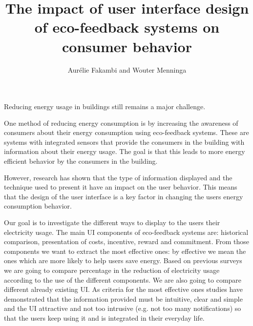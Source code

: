 \documentclass[journal]{vgtc}                %
\title{The impact of user interface design of eco-feedback systems on consumer behavior}
\author{Aur\'{e}lie Fakambi and Wouter Menninga}
\begin{document}


\maketitle


Reducing energy usage in buildings still remains a major challenge.

One method of reducing energy consumption is by increasing the awareness of consumers about their energy consumption using eco-feedback systems. These are systems with integrated sensors that provide the consumers in the building with information about their energy usage. The goal is that this leads to more energy efficient behavior by the consumers in the building. 

However, research has shown that the type of information displayed and the technique used to present it have an impact on the user behavior. This means that the design of the user interface is a key factor in changing the users energy consumption behavior.

Our goal is to investigate the different ways to display to the users their electricity usage.
The main UI components of eco-feedback systems are: historical comparison, presentation of costs, incentive, reward and commitment. From those components we want to extract the most effective ones: by effective we mean the ones which are more likely to help users save energy. Based on previous surveys we are going to compare percentage in the reduction of electricity usage according to the use of the different components. We are also going to compare different already existing UI. As criteria for the most effective ones studies have demonstrated that the information provided must be intuitive, clear and simple and the UI attractive and not too intrusive (e.g. not too many notifications) so that the users keep using it and is integrated in their everyday life.
\end{document}
